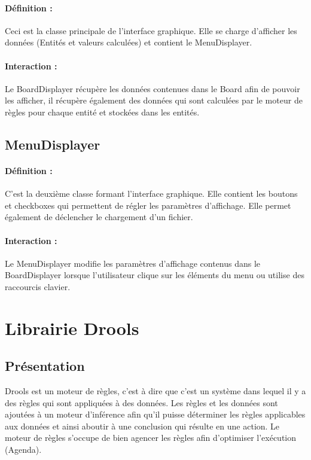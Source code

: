 			\paragraph{Définition :}
			Ceci est la classe principale de l'interface graphique. Elle se charge d'afficher les données (Entités et valeurs calculées)
			et contient le MenuDisplayer.
			\paragraph{Interaction :}
			Le BoardDisplayer récupère les données contenues dans le Board afin de pouvoir les afficher, il récupère également des données qui sont calculées
			par le moteur de règles pour chaque entité et stockées dans les entités.

		\subsection*{MenuDisplayer}

			\paragraph{Définition :}
			C'est la deuxième classe formant l'interface graphique. Elle contient les boutons et checkboxes qui permettent
			de régler les paramètres d'affichage. Elle permet également de déclencher le chargement d'un fichier.
			\paragraph{Interaction :}
			Le MenuDisplayer modifie les paramètres d'affichage contenus dans le BoardDisplayer lorsque l'utilisateur clique
			sur les éléments du menu ou utilise des raccourcis clavier.

	\section{Librairie Drools}

		\subsection{Présentation}
			Drools est un moteur de règles, c'est à dire que c'est un système dans lequel il y a des règles qui sont appliquées à des données. 
			Les règles et les données sont ajoutées	à un moteur d'inférence afin qu'il puisse déterminer les règles applicables aux données et ainsi aboutir à une conclusion qui résulte en une action.
			Le moteur de règles s'occupe de bien agencer les règles afin d'optimiser l'exécution (Agenda).

